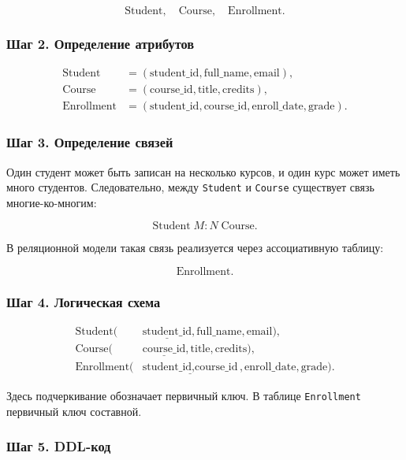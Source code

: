 \documentclass[12pt,a4paper]{article}
\theoremstyle{remark}
\begin{document}
\[
    \text{Student}, \quad \text{Course}, \quad \text{Enrollment}.
\]

\subsubsection*{Шаг 2. Определение атрибутов}

\[
\begin{aligned}
    \text{Student} &= (\text{student\_id}, \text{full\_name}, \text{email}),\\
    \text{Course} &= (\text{course\_id}, \text{title}, \text{credits}),\\
    \text{Enrollment} &= (\text{student\_id}, \text{course\_id}, \text{enroll\_date}, \text{grade}).
\end{aligned}
\]

\subsubsection*{Шаг 3. Определение связей}

Один студент может быть записан на несколько курсов, и один курс может иметь много студентов. Следовательно, между \texttt{Student} и \texttt{Course} существует связь многие-ко-многим:

\[
    \text{Student} \; M : N \; \text{Course}.
\]

В реляционной модели такая связь реализуется через ассоциативную таблицу:

\[
    \text{Enrollment}.
\]

\subsubsection*{Шаг 4. Логическая схема}

\[
\begin{aligned}
    \text{Student}(&\underline{\text{student\_id}}, \text{full\_name}, \text{email}),\\
    \text{Course}(&\underline{\text{course\_id}}, \text{title}, \text{credits}),\\
    \text{Enrollment}(&\underline{\text{student\_id}, \text{course\_id}}, \text{enroll\_date}, \text{grade}).
\end{aligned}
\]

Здесь подчеркивание обозначает первичный ключ. В таблице \texttt{Enrollment} первичный ключ составной.

\subsubsection*{Шаг 5. DDL-код}
\end{document}
